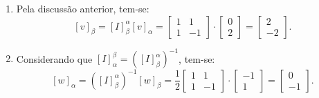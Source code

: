 \documentclass[12pt,a4paper]{article}
\begin{document}
\begin{ExerciseList}
\begin{enumerate}
\item Pela discussão anterior, tem-se:
\[
[v]_{\beta}
= [I]_{\beta}^{\alpha} [v]_{\alpha}
= 
\begin{bmatrix}
1 & 1 \\
1 & -1
\end{bmatrix}
\cdot
\begin{bmatrix}
0\\2
\end{bmatrix}
=
\begin{bmatrix}
2\\-2
\end{bmatrix}.
\]
\item Considerando que $[I]_{\alpha}^{\beta} = ([I]_{\beta}^{\alpha})^{-1}$, tem-se:
\[
[w]_{\alpha}
= ([I]_{\beta}^{\alpha})^{-1} [w]_{\beta}
=\frac{1}{2}
\begin{bmatrix}
1 & 1 \\
1 & -1
\end{bmatrix}
\cdot
\begin{bmatrix}
-1\\1
\end{bmatrix}
=
\begin{bmatrix}
0\\-1
\end{bmatrix}.
\]
\end{enumerate}




\end{ExerciseList}
\end{document}
